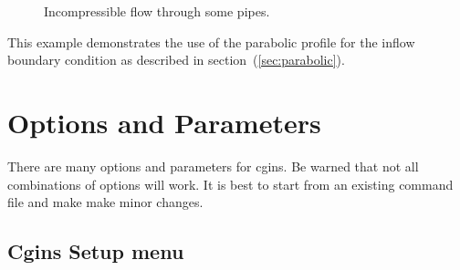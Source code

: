 \documentclass{article}
\newcommand{\obFigures}{\homeHenshaw/res/OverBlown/docFigures}  %
\newcommand{\solver}{cgins}
\begin{document}
{
\begin{figure}[hbt]
\newcommand{\figWidtha}{9.cm}
\newcommand{\trimfiga}[2]{\trimPlot{#1}{#2}{.0}{.0}{.0}{.025}}
\begin{center}
\end{center} 
\caption{Incompressible flow through some pipes.}
\end{figure}
}


% 
\noindent This example demonstrates the use of the parabolic profile for
the inflow boundary condition as described in section~(\ref{sec:parabolic}).


\clearpage



\clearpage




\clearpage
\section{Options and Parameters} \label{sec:parameters}

There are many options and parameters for \solver. Be warned that not all
combinations of options will work.  It is best to start from an existing command
file and make make minor changes.


\subsection{Cgins Setup menu}\label{sec:setupDialog}
\end{document}
